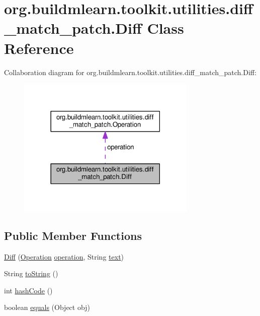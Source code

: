 \hypertarget{classorg_1_1buildmlearn_1_1toolkit_1_1utilities_1_1diff__match__patch_1_1Diff}{}\section{org.\+buildmlearn.\+toolkit.\+utilities.\+diff\+\_\+match\+\_\+patch.\+Diff Class Reference}
\label{classorg_1_1buildmlearn_1_1toolkit_1_1utilities_1_1diff__match__patch_1_1Diff}


Collaboration diagram for org.\+buildmlearn.\+toolkit.\+utilities.\+diff\+\_\+match\+\_\+patch.\+Diff\+:
\nopagebreak
\begin{figure}[H]
\begin{center}
\leavevmode
\includegraphics[width=242pt]{classorg_1_1buildmlearn_1_1toolkit_1_1utilities_1_1diff__match__patch_1_1Diff__coll__graph}
\end{center}
\end{figure}
\subsection*{Public Member Functions}
\begin{DoxyCompactItemize}
\item 
\hyperlink{classorg_1_1buildmlearn_1_1toolkit_1_1utilities_1_1diff__match__patch_1_1Diff_a0de06007ace0a454e07c6df4649d6b32}{Diff} (\hyperlink{enumorg_1_1buildmlearn_1_1toolkit_1_1utilities_1_1diff__match__patch_1_1Operation}{Operation} \hyperlink{classorg_1_1buildmlearn_1_1toolkit_1_1utilities_1_1diff__match__patch_1_1Diff_a1f605a7fb5e0ee23ba40ccb697212381}{operation}, String \hyperlink{classorg_1_1buildmlearn_1_1toolkit_1_1utilities_1_1diff__match__patch_1_1Diff_a64a42555135b9e66c13c757e346a3e88}{text})
\item 
String \hyperlink{classorg_1_1buildmlearn_1_1toolkit_1_1utilities_1_1diff__match__patch_1_1Diff_a0b151d4bb6963f868d0c81d122003ed5}{to\+String} ()
\item 
int \hyperlink{classorg_1_1buildmlearn_1_1toolkit_1_1utilities_1_1diff__match__patch_1_1Diff_a1460220b60a14eaa4aed6e671f89d811}{hash\+Code} ()
\item 
boolean \hyperlink{classorg_1_1buildmlearn_1_1toolkit_1_1utilities_1_1diff__match__patch_1_1Diff_a3010c254bcc4c7977dfb51a836955e96}{equals} (Object obj)
\end{DoxyCompactItemize}
